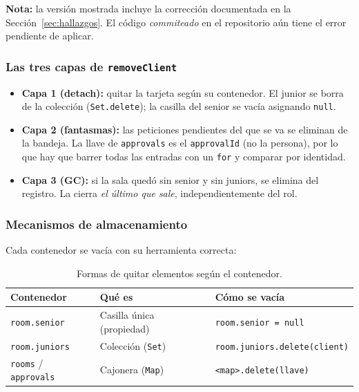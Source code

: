 \documentclass[11pt,a4paper]{article}
\begin{document}
\textbf{Nota:} la versión mostrada incluye la corrección documentada en la
Sección~\ref{sec:hallazgos}. El código \emph{commiteado} en el repositorio aún
tiene el error pendiente de aplicar.

\subsubsection{Las tres capas de \texttt{removeClient}}

\begin{itemize}
  \item \textbf{Capa 1 (detach):} quitar la tarjeta según su contenedor.
        El junior se borra de la colección (\texttt{Set.delete}); la casilla del
        senior se vacía asignando \texttt{null}.
  \item \textbf{Capa 2 (fantasmas):} las peticiones pendientes del que se va se
        eliminan de la bandeja. La llave de \texttt{approvals} es el
        \texttt{approvalId} (no la persona), por lo que hay que barrer todas
        las entradas con un \texttt{for} y comparar por identidad.
  \item \textbf{Capa 3 (GC):} si la sala quedó sin senior y sin juniors, se
        elimina del registro. La cierra \emph{el último que sale},
        independientemente del rol.
\end{itemize}

\subsubsection{Mecanismos de almacenamiento}

Cada contenedor se vacía con su herramienta correcta:

\begin{table}[h]
  \centering
  \begin{tabular}{@{}p{3.6cm}p{4.4cm}p{5cm}@{}}
    \toprule
    \textbf{Contenedor} & \textbf{Qué es} & \textbf{Cómo se vacía} \\
    \midrule
    \texttt{room.senior} & Casilla única (propiedad) & \texttt{room.senior = null} \\
    \texttt{room.juniors} & Colección (\texttt{Set}) & \texttt{room.juniors.delete(client)} \\
    \texttt{rooms} / \texttt{approvals} & Cajonera (\texttt{Map}) & \texttt{<map>.delete(llave)} \\
    \bottomrule
  \end{tabular}
  \caption{Formas de quitar elementos según el contenedor.}
\end{table}
\end{document}
